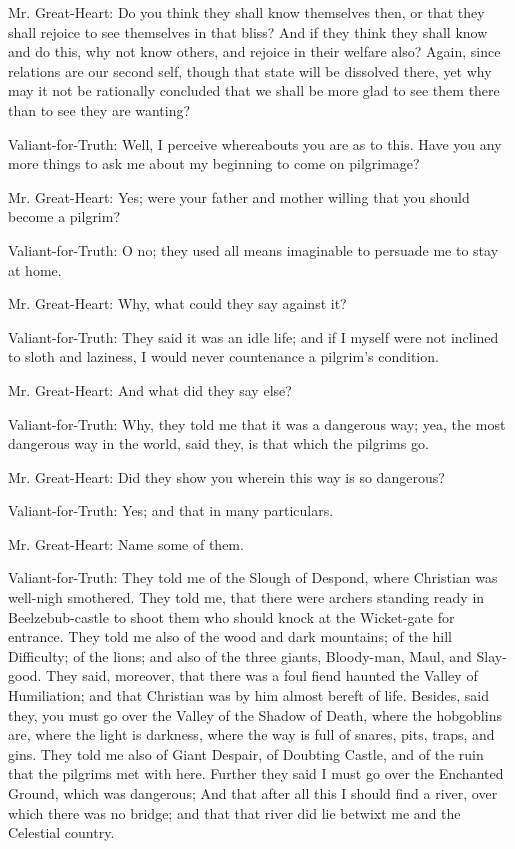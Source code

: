 Mr. Great-Heart: Do you think they shall know themselves then, or that they shall rejoice to see themselves in that bliss? And if they think they shall know and do this, why not know others, and rejoice in their welfare also? Again, since relations are our second self, though that state will be dissolved there, yet why may it not be rationally concluded that we shall be more glad to see them there than to see they are wanting?

Valiant-for-Truth: Well, I perceive whereabouts you are as to this. Have you any more things to ask me about my beginning to come on pilgrimage?

Mr. Great-Heart: Yes; were your father and mother willing that you should become a pilgrim?

Valiant-for-Truth: O no; they used all means imaginable to persuade me to stay at home.

Mr. Great-Heart: Why, what could they say against it?

Valiant-for-Truth: They said it was an idle life; and if I myself were not inclined to sloth and laziness, I would never countenance a pilgrim's condition.

Mr. Great-Heart: And what did they say else?

Valiant-for-Truth: Why, they told me that it was a dangerous way; yea, the most dangerous way in the world, said they, is that which the pilgrims go.

Mr. Great-Heart: Did they show you wherein this way is so dangerous?

Valiant-for-Truth: Yes; and that in many particulars.

Mr. Great-Heart: Name some of them.

Valiant-for-Truth: They told me of the Slough of Despond, where Christian was well-nigh smothered. They told me, that there were archers standing ready in Beelzebub-castle to shoot them who should knock at the Wicket-gate for entrance. They told me also of the wood and dark mountains; of the hill Difficulty; of the lions; and also of the three giants, Bloody-man, Maul, and Slay-good. They said, moreover, that there was a foul fiend haunted the Valley of Humiliation; and that Christian was by him almost bereft of life. Besides, said they, you must go over the Valley of the Shadow of Death, where the hobgoblins are, where the light is darkness, where the way is full of snares, pits, traps, and gins. They told me also of Giant Despair, of Doubting Castle, and of the ruin that the pilgrims met with here. Further they said I must go over the Enchanted Ground, which was dangerous; And that after all this I should find a river, over which there was no bridge; and that that river did lie betwixt me and the Celestial country.

